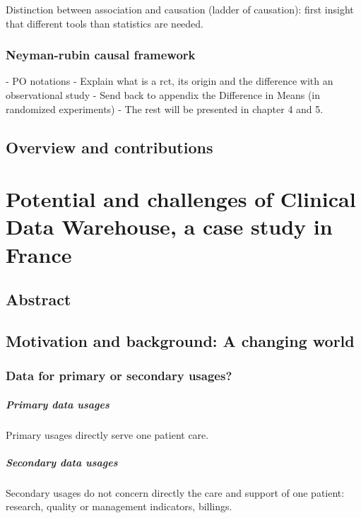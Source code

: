 \documentclass{report}
\begin{document}
\begin{baground_box_left}
  Distinction between association and causation (ladder of causation): first
  insight that different tools than statistics are needed.


  \subsection{Neyman-rubin causal framework}\label{subsec:intro:causal_framework}

  - PO notations
  - Explain what is a rct, its origin and the difference with an observational study
  - Send back to appendix the Difference in Means  (in randomized experiments)
  - The rest will be presented in chapter 4 and 5.

\end{baground_box_left}

\section{Overview and contributions}\label{sec:intro:contributions}



\chapter{Potential and challenges of Clinical Data Warehouse, a case study in France}\label{chapter:cdw}

\section{Abstract}\label{sec:cdw:abstract}
\section{Motivation and background: A changing world}\label{sec:cdw:motivation}

\subsection{Data for primary or secondary
  usages?}\label{subsec:cdw:data_usages}

\paragraph{Primary data usages}
Primary usages directly serve one patient care.

\paragraph{Secondary data usages}
Secondary usages do not concern directly the care and support of one patient:
research, quality or management indicators, billings.
\end{document}
